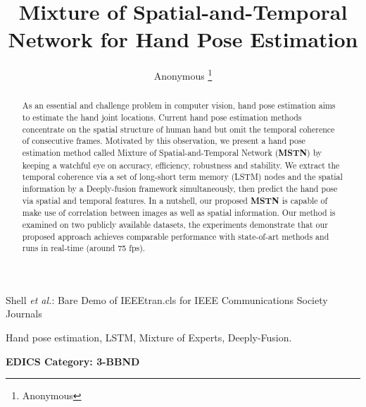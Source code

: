 \documentclass[journal,comsoc]{IEEEtran}
\begin{document}
\title{Mixture of Spatial-and-Temporal Network for Hand Pose Estimation}

\author{{Anonymous}%
\thanks{Anonymous}}

%
{Shell \MakeLowercase{\textit{et al.}}: Bare Demo of IEEEtran.cls for IEEE Communications Society Journals}

\maketitle

\begin{abstract}
As an essential and challenge problem in computer vision, hand pose estimation aims to estimate the hand joint locations. Current hand pose
estimation methods concentrate on the spatial structure of human hand but omit the temporal coherence of consecutive frames.
Motivated by this observation, we present a hand pose estimation method called Mixture of Spatial-and-Temporal Network (\textbf{MSTN})
by keeping a watchful eye on accuracy, efficiency, robustness and stability. We extract the temporal coherence via a set of long-short
term memory (LSTM) nodes and the spatial information by a Deeply-fusion framework simultaneously, then predict the hand pose via spatial
and temporal features. In a nutshell, our proposed \textbf{MSTN} is capable of make use of correlation between images as well as spatial
information. Our method is examined on two publicly available datasets, the experiments demonstrate that our proposed approach achieves
comparable performance with state-of-art methods and runs in real-time (around 75 fps).

\end{abstract}
\begin{IEEEkeywords}
Hand pose estimation, LSTM, Mixture of Experts, Deeply-Fusion.
\end{IEEEkeywords}


\ifCLASSOPTIONpeerreview
\begin{center} \bfseries EDICS Category: 3-BBND \end{center}
\fi
%
\IEEEpeerreviewmaketitle
\end{document}
